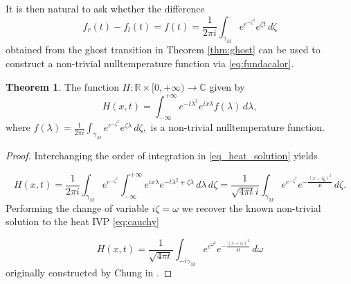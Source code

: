 \documentclass[12pt]{article}
\theoremstyle{definition}
\newtheorem{theorem}{Theorem}[section]
\begin{document}
It is then natural to ask whether the difference \[f_r(t)-f_l(t)=f(t)=\frac{1}{2\pi i}\int_{\gamma_M}e^{e^{- \zeta^2}}e^{\zeta t} \,d\zeta \] obtained from the ghost transition in Theorem \ref{thm:ghost} can be used to construct a non-trivial nulltemperature function via \eqref{eq:fundacalor}.

\begin{theorem}\label{thm:moraldahistoria}
    The function $H: \mathbb{R} \times [0, + \infty) \to \mathbb{C}$ given by
    \begin{equation}
    \label{eq_heat_solution}
        H(x,t)=\int_{-\infty}^{+ \infty} e^{-t \lambda^2}e^{ix \lambda}f(\lambda) \,d\lambda,
    \end{equation} where \( f(\lambda)=\frac{1}{2\pi i}\int_{\gamma_M}e^{e^{- \zeta^2}}e^{\zeta \lambda} \,d\zeta, \) is a non-trivial nulltemperature function.
\end{theorem}

\begin{proof}
Interchanging the order of integration in \eqref{eq_heat_solution} yields

\begin{equation*}\label{eq:heatnonunique} H(x,t)= \frac{1}{2 \pi i}\int_{\gamma_M}e^{e^{-\zeta^2}} \int_{-\infty}^{+ \infty}e^{ix \lambda}e^{-t\lambda^2+\zeta \lambda} \,d\lambda \,d\zeta  = \frac{1}{\sqrt{4 \pi t}i} \int_{\gamma_M} e^{e^{-\zeta^2}}e^{-\frac{(x-i\zeta)^2}{4t}} \,d\zeta . \end{equation*}
Performing the change of variable $i \zeta= \omega$  we recover the known non-trivial solution to the heat IVP \eqref{eq:cauchy}

\[H(x,t)=\frac{1}{\sqrt{4 \pi t}} \int_{-i \gamma_M} e^{e^{\omega^2}}e^{- \frac{(x- \omega)^2}{4t}} \,d\omega \] originally constructed by Chung in \cite{Chung}.
\end{proof}
\end{document}
